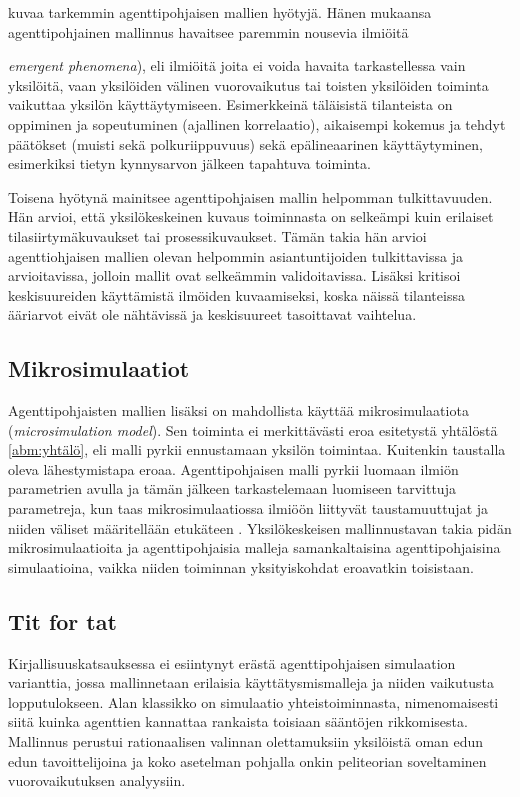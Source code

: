 \documentclass[finnish,gradu,twoside,12pt]{tktltiki}
\begin{document}
\citet{Bonabeau2002} kuvaa tarkemmin agenttipohjaisen mallien hyötyjä. Hänen mukaansa agenttipohjainen mallinnus havaitsee paremmin nousevia ilmiöitä {\textit{emergent phenomena}), eli ilmiöitä joita ei voida havaita tarkastellessa vain yksilöitä, vaan yksilöiden välinen vuorovaikutus tai toisten yksilöiden toiminta vaikuttaa yksilön käyttäytymiseen. Esimerkkeinä täläisistä tilanteista on oppiminen ja sopeutuminen (ajallinen korrelaatio), aikaisempi kokemus ja tehdyt päätökset (muisti sekä polkuriippuvuus) sekä epälineaarinen käyttäytyminen, esimerkiksi tietyn kynnysarvon jälkeen tapahtuva toiminta.

Toisena hyötynä \citet{Bonabeau2002} mainitsee agenttipohjaisen mallin helpomman tulkittavuuden. Hän arvioi, että yksilökeskeinen kuvaus toiminnasta on selkeämpi kuin erilaiset tilasiirtymäkuvaukset tai prosessikuvaukset. Tämän takia hän arvioi agenttiohjaisen mallien olevan helpommin asiantuntijoiden tulkittavissa ja arvioitavissa, jolloin mallit ovat selkeämmin validoitavissa. Lisäksi \citet{Bonabeau2002} kritisoi keskisuureiden käyttämistä ilmöiden kuvaamiseksi, koska näissä tilanteissa ääriarvot eivät ole nähtävissä ja keskisuureet tasoittavat vaihtelua.

\subsection{Mikrosimulaatiot}

Agenttipohjaisten mallien lisäksi on mahdollista käyttää mikrosimulaatiota  (\textit{microsimulation model}). Sen toiminta ei merkittävästi eroa esitetystä yhtälöstä \ref{abm:yhtälö}, eli malli pyrkii ennustamaan yksilön toimintaa. Kuitenkin taustalla oleva lähestymistapa eroaa. Agenttipohjaisen malli pyrkii luomaan ilmiön parametrien avulla ja tämän jälkeen tarkastelemaan luomiseen tarvittuja parametreja, kun taas mikrosimulaatiossa ilmiöön liittyvät taustamuuttujat ja niiden väliset määritellään etukäteen \citep[58--59]{Gilbert2005}. Yksilökeskeisen mallinnustavan takia pidän mikrosimulaatioita ja agenttipohjaisia malleja samankaltaisina agenttipohjaisina simulaatioina, vaikka niiden toiminnan yksityiskohdat eroavatkin toisistaan.

\subsection{Tit for tat}

Kirjallisuuskatsauksessa ei esiintynyt erästä agenttipohjaisen simulaation varianttia, jossa mallinnetaan erilaisia käyttätysmismalleja ja niiden vaikutusta lopputulokseen. Alan klassikko on \citet{Axelrod01031980} simulaatio yhteistoiminnasta, nimenomaisesti siitä kuinka agenttien kannattaa rankaista toisiaan sääntöjen rikkomisesta. Mallinnus perustui rationaalisen valinnan olettamuksiin yksilöistä oman edun edun tavoittelijoina ja koko asetelman pohjalla onkin peliteorian soveltaminen vuorovaikutuksen analyysiin.

}
\end{document}
